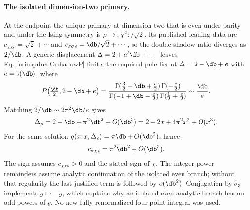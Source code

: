 \paragraph{The isolated dimension-two primary.} At the endpoint the unique primary at dimension two that is even under
parity and under the Ising symmetry is $\rho\to{:}\chi^2{:}/\sqrt2$. Its published leading data are
$c_{\chi\chi\rho}=\sqrt2+\cdots$ and $c_{\sigma\sigma\rho}=\db/\sqrt2+\cdots$, so the double-shadow ratio diverges as
$2/\db$. A generic displacement $\Delta=2+a'\db+\cdots$ leaves Eq.~\eqref{sri:eq:dualC:shadowP} finite; the required pole
lies at $\Delta=2-\db+e$ with $e=o(\db)$, where
\begin{equation}
 P\bigl(\tfrac{\db}{2},2-\db+e\bigr)=\frac{\Gamma(\frac32-\db+\frac e2)\,\Gamma(-\frac e2)}
 {\Gamma(-1+\db-\frac e2)\,\Gamma(\frac12+\frac e2)}\sim\frac{\db}{e} .
\end{equation}
Matching $2/\db\sim2\pi^2\db/e$ gives
\begin{equation}
 \Delta_\rho=2-\db+\pi^2\db^2+O(\db^3)=2-2x+4\pi^2x^2+O(x^3).
\end{equation}
For the same solution $q(x;x,\Delta_\rho)=\pi\db+O(\db^2)$, hence
\begin{equation}
 c_{\sigma\chi\rho}=\pi^2\db^2+O(\db^3).
\end{equation}
The sign assumes $c_{\chi\chi\rho}>0$ and the stated sign of $\chi$. The integer-power remainders assume analytic
continuation of the isolated even branch; without that regularity the last justified term is followed by $o(\db^2)$.
Conjugation by $\hat\sigma_3$ implements $g\mapsto-g$, which explains why an isolated even analytic branch has no odd
powers of $g$. No new fully renormalized four-point integral was used.

